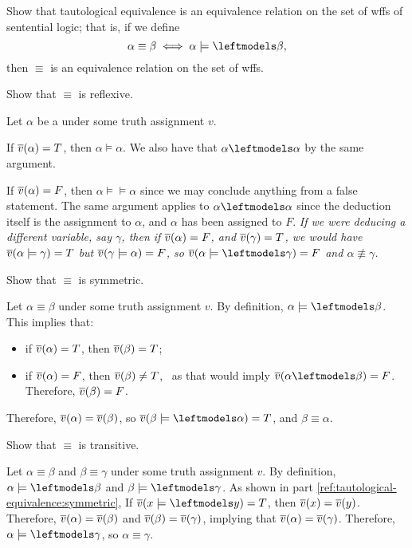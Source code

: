 \begin{problem}
  Show that tautological equivalence is an equivalence relation
  on the set of wffs of sentential logic;
  that is, if we define
  \[ \alpha \equiv \beta \iff \alpha \models \backmodels \beta, \]
  then $\equiv$ is an equivalence relation on the set of wffs.
\end{problem}
\begin{Answer}
  \begin{enumroman}
    \item Show that $\equiv$ is reflexive.
    
    \step
    Let $\alpha$ be a under some truth assignment $v$.

    \step
    If $\overline{v}(\alpha) = T$, then $\alpha \models \alpha$.
    We also have that $\alpha \backmodels \alpha$ by the same argument.

    \step
    If $\overline{v}(\alpha) = F$, then $\alpha \models \models \alpha$
    since we may conclude anything from a false statement.
    The same argument applies to $\alpha \backmodels \alpha$
    since the deduction itself is the assignment to $\alpha$,
    and $\alpha$ has been assigned to $F$.
    \emph{
      If we were deducing a different variable, say $\gamma$,
      then if $\overline{v}(\alpha) = F$, and $\overline{v}(\gamma) = T$,
      we would have $\overline{v}(\alpha \models \gamma) = T$
      but $\overline{v}(\gamma \models \alpha) = F$,
      so $\vbar(\alpha \models \backmodels \gamma) = F$
      and $\alpha \nequiv \gamma$.
    }


    \item
      Show that $\equiv$ is symmetric.

      \step
      Let $\alpha \equiv \beta$ under some truth assignment $v$.
      By definition, $\alpha \models \backmodels \beta$.
      This implies that:
      \begin{itemize}
        \item if $\overline{v}(\alpha) = T$, then $\overline{v}(\beta) = T$;
        \item if $\overline{v}(\alpha) = F$, then $\overline{v}(\beta) \ne T$,~\label{ref:tautological-equivalence:symmetric}
          as that would imply $\vbar(\alpha \backmodels \beta) = F$.
          Therefore, $\overline{v}(\beta) = F$.
      \end{itemize}
      Therefore, $\overline{v}(\alpha) = \overline{v}(\beta)$, so $\vbar(\beta \models \backmodels \alpha) = T$, and $\beta \equiv \alpha$.
    \item
      Show that $\equiv$ is transitive.

      \step
      Let $\alpha \equiv \beta$ and $\beta \equiv \gamma$ under some truth assignment $v$.
      By definition, $\alpha \models \backmodels \beta$ and $\beta \models \backmodels \gamma$.
      As shown in part \ref{ref:tautological-equivalence:symmetric},
      If $\vbar(x \models \backmodels y) = T$, then $\overline{v}(x) = \overline{v}(y)$.
      Therefore, $\overline{v}(\alpha) = \overline{v}(\beta)$ and $\overline{v}(\beta) = \overline{v}(\gamma)$,
      implying that $\overline{v}(\alpha) = \overline{v}(\gamma)$.
      Therefore, $\alpha \models \backmodels \gamma$, so $\alpha \equiv \gamma$.
  \end{enumroman}
\end{Answer}
